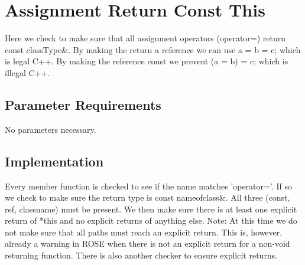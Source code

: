 %
%

\section{Assignment Return Const This}
\label{AssignmentReturnConstThis::overview}
Here we check to make sure that all assignment operators
   (operator=) return const classType\&. By making the return a
   reference we can use a = b = c; which is legal C++.  By making the reference
   const we prevent (a = b) = c; which is illegal C++. 

\subsection{Parameter Requirements}

   No parameters necessary.

\subsection{Implementation}

Every member function is checked to see if the name matches
'operator='.  If so we check to make sure the return type is const
nameofclass\&.  All three (const, ref, classname) must be present.
We then make sure there is at least one explicit return of *this
and no explicit returns of anything else.
Note:  At this time we do not make sure that all paths must reach
an explicit return.  This is, however, already a warning in ROSE                                                                                                      
when there is not an explicit return for a non-void returning
function.  There is also another checker to ensure explicit
returns. 

